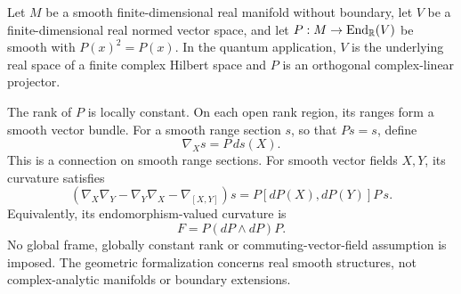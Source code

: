\begin{classical}\label{core:classical:001}\label{core:thm:projected}
Let $M$ be a smooth finite-dimensional real manifold without boundary, let $V$ be a finite-dimensional real normed vector space, and let $P:M\to\operatorname{End}_{\bbR}(V)$ be smooth with $P(x)^2=P(x)$. In the quantum application, $V$ is the underlying real space of a finite complex Hilbert space and $P$ is an orthogonal complex-linear projector.

The rank of $P$ is locally constant. On each open rank region, its ranges form a smooth vector bundle. For a smooth range section $s$, so that $Ps=s$, define
\[
\nabla_Xs=P\,ds(X).
\]
This is a connection on smooth range sections. For smooth vector fields $X,Y$, its curvature satisfies
\[
\boxed{
(\nabla_X\nabla_Y-\nabla_Y\nabla_X-\nabla_{[X,Y]})s
=P[dP(X),dP(Y)]P\,s.
}
\]
Equivalently, its endomorphism-valued curvature is
\[
\boxed{F=P(dP\wedge dP)P.}
\]
No global frame, globally constant rank or commuting-vector-field assumption is imposed. The geometric formalization concerns real smooth structures, not complex-analytic manifolds or boundary extensions.
\end{classical}


